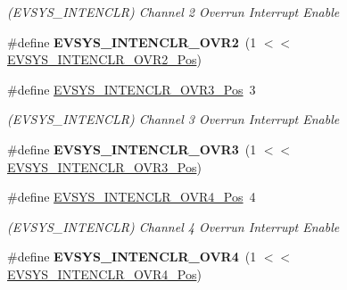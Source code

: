 \begin{DoxyCompactItemize}
\begin{DoxyCompactList}\small\item\em (E\+V\+S\+Y\+S\+\_\+\+I\+N\+T\+E\+N\+C\+L\+R) Channel 2 Overrun Interrupt Enable \end{DoxyCompactList}\item 
\hypertarget{group___s_a_m_l21___e_v_s_y_s_ga884111ff37e53f0be9eef9467f2053b7}{}\#define {\bfseries E\+V\+S\+Y\+S\+\_\+\+I\+N\+T\+E\+N\+C\+L\+R\+\_\+\+O\+V\+R2}~(1 $<$$<$ \hyperlink{group___s_a_m_l21___e_v_s_y_s_ga44ebcf12fed04a93c6caf4d3c6261210}{E\+V\+S\+Y\+S\+\_\+\+I\+N\+T\+E\+N\+C\+L\+R\+\_\+\+O\+V\+R2\+\_\+\+Pos})\label{group___s_a_m_l21___e_v_s_y_s_ga884111ff37e53f0be9eef9467f2053b7}

\item 
\hypertarget{group___s_a_m_l21___e_v_s_y_s_gaa36c399686fdfdb7118d77edfa7e4343}{}\#define \hyperlink{group___s_a_m_l21___e_v_s_y_s_gaa36c399686fdfdb7118d77edfa7e4343}{E\+V\+S\+Y\+S\+\_\+\+I\+N\+T\+E\+N\+C\+L\+R\+\_\+\+O\+V\+R3\+\_\+\+Pos}~3\label{group___s_a_m_l21___e_v_s_y_s_gaa36c399686fdfdb7118d77edfa7e4343}

\begin{DoxyCompactList}\small\item\em (E\+V\+S\+Y\+S\+\_\+\+I\+N\+T\+E\+N\+C\+L\+R) Channel 3 Overrun Interrupt Enable \end{DoxyCompactList}\item 
\hypertarget{group___s_a_m_l21___e_v_s_y_s_ga3b8e7cdfd01c6f9c90a598049ea69200}{}\#define {\bfseries E\+V\+S\+Y\+S\+\_\+\+I\+N\+T\+E\+N\+C\+L\+R\+\_\+\+O\+V\+R3}~(1 $<$$<$ \hyperlink{group___s_a_m_l21___e_v_s_y_s_gaa36c399686fdfdb7118d77edfa7e4343}{E\+V\+S\+Y\+S\+\_\+\+I\+N\+T\+E\+N\+C\+L\+R\+\_\+\+O\+V\+R3\+\_\+\+Pos})\label{group___s_a_m_l21___e_v_s_y_s_ga3b8e7cdfd01c6f9c90a598049ea69200}

\item 
\hypertarget{group___s_a_m_l21___e_v_s_y_s_gab04504d70fc1975108adf154d27f95b6}{}\#define \hyperlink{group___s_a_m_l21___e_v_s_y_s_gab04504d70fc1975108adf154d27f95b6}{E\+V\+S\+Y\+S\+\_\+\+I\+N\+T\+E\+N\+C\+L\+R\+\_\+\+O\+V\+R4\+\_\+\+Pos}~4\label{group___s_a_m_l21___e_v_s_y_s_gab04504d70fc1975108adf154d27f95b6}

\begin{DoxyCompactList}\small\item\em (E\+V\+S\+Y\+S\+\_\+\+I\+N\+T\+E\+N\+C\+L\+R) Channel 4 Overrun Interrupt Enable \end{DoxyCompactList}\item 
\hypertarget{group___s_a_m_l21___e_v_s_y_s_gacac5bff7b8dee95f3f5e7f28abbcce9d}{}\#define {\bfseries E\+V\+S\+Y\+S\+\_\+\+I\+N\+T\+E\+N\+C\+L\+R\+\_\+\+O\+V\+R4}~(1 $<$$<$ \hyperlink{group___s_a_m_l21___e_v_s_y_s_gab04504d70fc1975108adf154d27f95b6}{E\+V\+S\+Y\+S\+\_\+\+I\+N\+T\+E\+N\+C\+L\+R\+\_\+\+O\+V\+R4\+\_\+\+Pos})\label{group___s_a_m_l21___e_v_s_y_s_gacac5bff7b8dee95f3f5e7f28abbcce9d}


\end{DoxyCompactItemize}
